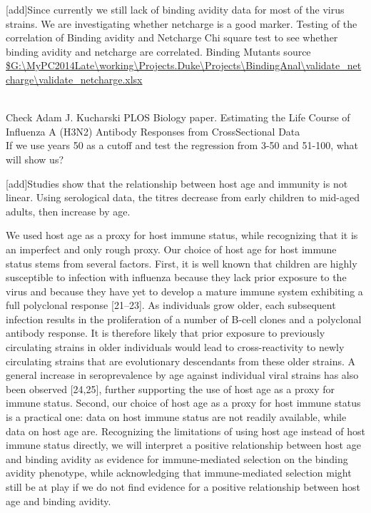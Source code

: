 \documentclass{article}
\begin{document}
[add]Since currently we still lack of binding avidity data for most of the virus strains. We are investigating whether netcharge is a good marker. 
Testing of the correlation of Binding avidity and Netcharge
Chi square test to see whether binding avidity and netcharge are correlated.
Binding Mutants source
\url{$G:\MyPC2014Late\working\Projects.Duke\Projects\BindingAnal\validate_netcharge\validate_netcharge.xlsx}

     \\
     Check Adam J. Kucharski PLOS Biology paper. Estimating the Life Course of Influenza A (H3N2) Antibody Responses from CrossSectional Data
     \\
     If we use years 50 as a cutoff and test the regression from 3-50 and 51-100, what will show us?   
                 
[add]Studies show that the relationship between host age and immunity is not linear. Using serological data, the titres decrease from early children to mid-aged adults, then increase by age. 


We used host age as a proxy for host immune status, while recognizing that it is an imperfect and only rough proxy. Our choice of host age for host immune status stems from several factors. First, it is well known that children are highly susceptible to infection with influenza because they lack prior exposure to the virus and because they have yet to develop a mature immune system exhibiting a full polyclonal response [21–23]. As individuals grow older, each subsequent infection results in the proliferation of a number of B-cell clones and a polyclonal antibody response. It is therefore likely that prior exposure to previously circulating strains in older individuals would lead to cross-reactivity to newly circulating strains that are evolutionary descendants from these older strains. A general increase in seroprevalence by age against individual viral strains has also been observed [24,25], further supporting the use of host age as a proxy for immune status. Second, our choice of host age as a proxy for host immune status is a practical one: data on host immune status are not readily available, while data on host age are. Recognizing the limitations of using host age instead of host immune status directly, we will interpret a positive relationship between host age and binding avidity as evidence for immune-mediated selection on the binding avidity phenotype, while acknowledging that immune-mediated selection might still be at play if we do not find evidence for a positive relationship between host age and binding avidity. 
\end{document}
